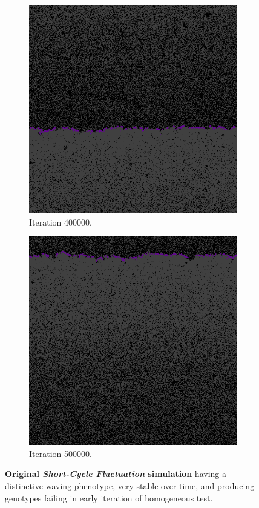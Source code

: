 \begin{figure}[H]
\begin{subfigure}{.25\textwidth}
  \centering
  \includegraphics[width=.9\linewidth]{img/sm400000}
  \caption{Iteration 400000.}
\end{subfigure}%
\begin{subfigure}{.25\textwidth}
  \centering
  \includegraphics[width=.9\linewidth]{img/sm500000}
  \caption{Iteration 500000.}
\end{subfigure}
\caption{\textbf{Original \emph{Short-Cycle Fluctuation} simulation} having a distinctive waving phenotype, very stable over time, and producing genotypes failing in early iteration of homogeneous test.}
\label{fig:smalldistinctive}
\end{figure}
